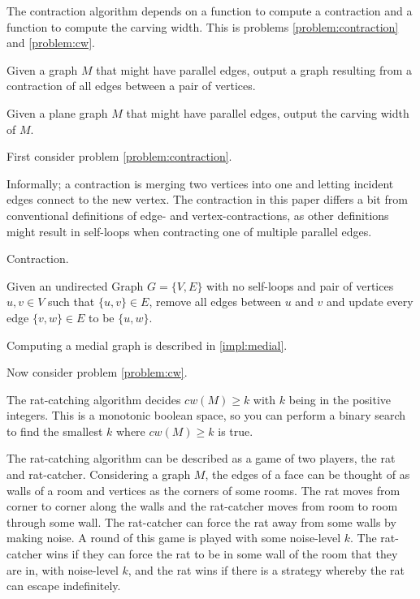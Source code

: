 \documentclass{article}
\begin{document}
	The contraction algorithm depends on a function to compute a contraction and a function to compute the carving width. This is problems \ref{problem:contraction} and \ref{problem:cw}.

	\begin{problem}\label{problem:contraction}
		Given a graph $M$ that might have parallel edges, output a graph resulting from a contraction of all edges between a pair of vertices.
	\end{problem}

	\begin{problem}\label{problem:cw}
		Given a plane graph $M$ that might have parallel edges, output the carving width of $M$.
	\end{problem}

	First consider problem \ref{problem:contraction}.

	Informally; a contraction is merging two vertices into one and letting incident edges connect to the new vertex. The contraction in this paper differs a bit from conventional definitions of edge- and vertex-contractions, as other definitions might result in self-loops when contracting one of multiple parallel edges.

	\begin{definition}
		Contraction.

		Given an undirected Graph $G=\{V,E\}$ with no self-loops and pair of vertices $u,v \in V$ such that $\{u,v\} \in E$, remove all edges between $u$ and $v$ and update every edge $\{v,w\} \in E$ to be $\{u,w\}$.
	\end{definition}

	Computing a medial graph is described in \ref{impl:medial}.

	Now consider problem \ref{problem:cw}.

	The rat-catching algorithm decides $cw(M) \geq k$ with $k$ being in the positive integers. This is a monotonic boolean space, so you can perform a binary search to find the smallest $k$ where $cw(M) \geq k$ is true.

	The rat-catching algorithm can be described as a game of two players, the rat and rat-catcher. Considering a graph $M$, the edges of a face can be thought of as walls of a room and vertices as the corners of some rooms. The rat moves from corner to corner along the walls and the rat-catcher moves from room to room through some wall. The rat-catcher can force the rat away from some walls by making noise. A round of this game is played with some noise-level $k$. The rat-catcher wins if they can force the rat to be in some wall of the room that they are in, with noise-level $k$, and the rat wins if there is a strategy whereby the rat can escape indefinitely.
\end{document}
